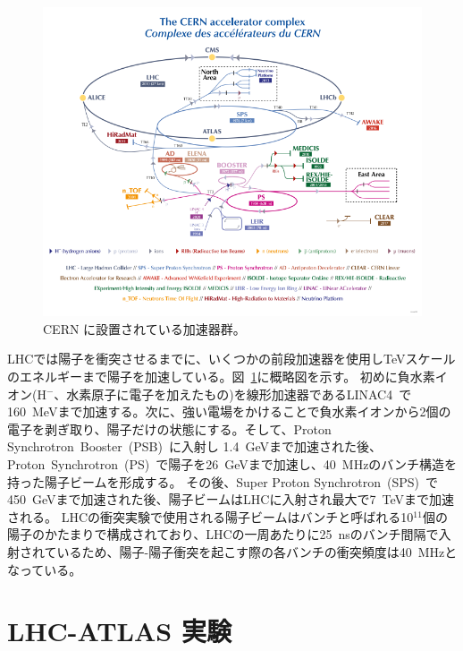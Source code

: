 \begin{figure}[tb]
  \centering
  \includegraphics[clip, width=14cm]{fig/2/CCC-v2022.pdf}
  \caption{CERN に設置されている加速器群\cite{article:accelerator-complex}。}
  \label{fig:LHC加速器}
\end{figure}


LHCでは陽子を衝突させるまでに、いくつかの前段加速器を使用しTeVスケールのエネルギーまで陽子を加速している。図~\ref{fig:LHC加速器}に概略図を示す。
初めに負水素イオン(H$^-$、水素原子に電子を加えたもの)を線形加速器であるLINAC4~\cite{article:Linearaccelerator4}で160~MeVまで加速する。次に、強い電場をかけることで負水素イオンから2個の電子を剥ぎ取り、陽子だけの状態にする。そして、Proton Synchrotron~Booster~(PSB)~\cite{article:TheProtonSynchrotronBooster}に入射し 1.4~GeVまで加速された後、Proton~Synchrotron~(PS)~\cite{article:TheProtonSynchrotron}で陽子を26~GeVまで加速し、40~MHzのバンチ構造を持った陽子ビームを形成する。
その後、Super Proton Synchrotron~(SPS)~\cite{article:TheSuperProtonSynchrotron}で450~GeVまで加速された後、陽子ビームはLHCに入射され最大で7~TeVまで加速される。
LHCの衝突実験で使用される陽子ビームはバンチと呼ばれる10$^{11}$個の陽子のかたまりで構成されており、LHCの一周あたりに25~nsのバンチ間隔で入射されているため、陽子-陽子衝突を起こす際の各バンチの衝突頻度は40~MHzとなっている。



\section{LHC-ATLAS 実験}\label{section2-2}

